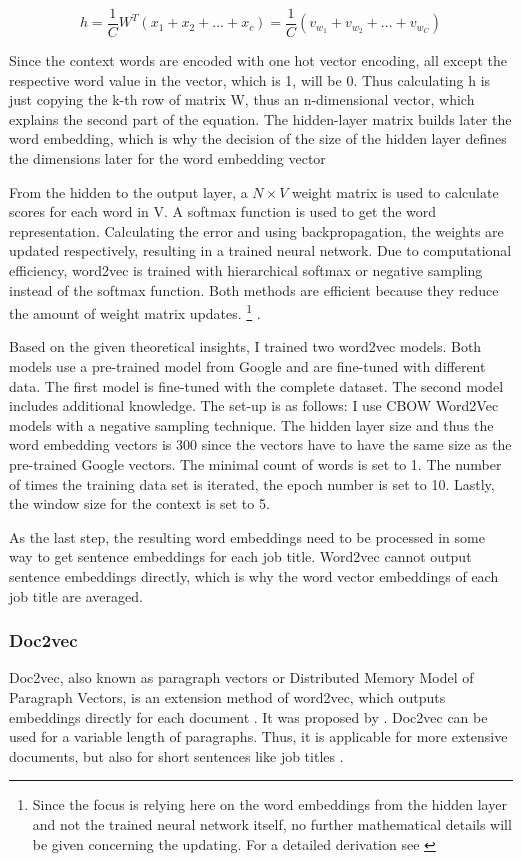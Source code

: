 \documentclass[12pt, a4paper, titlepage]{article}
\begin{document}
\[ h = \frac{1}{C} W^T(x_1 + x_2 + ... +x_c) = \frac{1}{C}(v_{w_1} + v_{w_2} + ... + v_{w_C}) \]

Since the context words are encoded with one hot vector encoding, all except the respective word value in the vector, which is 1, will be 0. Thus calculating h is just copying the k-th row of matrix W, thus an n-dimensional vector, which explains the second part of the equation. The hidden-layer matrix builds later the word embedding, which is why the decision of the size of the hidden layer defines the dimensions later for the word embedding vector \citep{rong2014}

From the hidden to the output layer, a $N \times V$ weight matrix is used to calculate scores for each word in V. A softmax function is used to get the word representation. Calculating the error and using backpropagation, the weights are updated respectively, resulting in a trained neural network. Due to computational efficiency, word2vec is trained with hierarchical softmax or negative sampling instead of the softmax function. Both methods are efficient because they reduce the amount of weight matrix updates. \footnote{Since the focus is relying here on the word embeddings from the hidden layer and not the trained neural network itself, no further mathematical details will be given concerning the updating. For a detailed derivation see \citep{rong2014}} \citep{rong2014, simonton2017}.

Based on the given theoretical insights, I trained two word2vec models. Both models use a pre-trained model from Google and are fine-tuned with different data. The first model is fine-tuned with the complete dataset. The second model includes additional knowledge. The set-up is as follows: I use \ac{CBOW} Word2Vec models with a negative sampling technique. The hidden layer size and thus the word embedding vectors is 300 since the vectors have to have the same size as the pre-trained Google vectors. The minimal count of words is set to 1. The number of times the training data set is iterated, the epoch number is set to 10. Lastly, the window size for the context is set to 5. 

As the last step, the resulting word embeddings need to be processed in some way to get sentence embeddings for each job title. Word2vec cannot output sentence embeddings directly, which is why the word vector embeddings of each job title are averaged. 

\subsubsection*{Doc2vec}
Doc2vec, also known as paragraph vectors or Distributed Memory Model of Paragraph Vectors, is an extension method of word2vec, which outputs embeddings directly for each document \citep{lau2016}. It was proposed by \cite{le2014}. Doc2vec can be used for a variable length of paragraphs. Thus, it is applicable for more extensive documents, but also for short sentences like job titles \citep{le2014}. 
\end{document}
